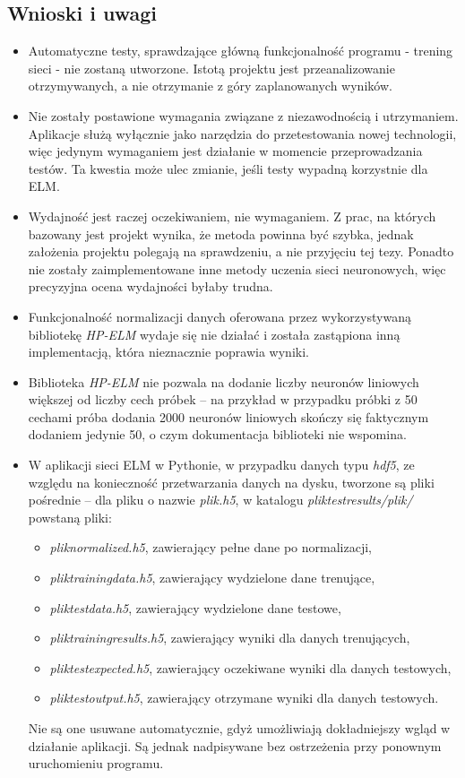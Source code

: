 \documentclass{article}
\begin{document}
\subsection{Wnioski i uwagi}
\begin{itemize}
\item Automatyczne testy, sprawdzające główną funkcjonalność programu - trening sieci - nie zostaną utworzone. Istotą projektu jest przeanalizowanie otrzymywanych, a nie otrzymanie z góry zaplanowanych wyników.
\item Nie zostały postawione wymagania związane z niezawodnością i utrzymaniem. Aplikacje służą wyłącznie jako narzędzia do przetestowania nowej technologii, więc jedynym wymaganiem jest działanie w momencie przeprowadzania testów. Ta kwestia może ulec zmianie, jeśli testy wypadną korzystnie dla ELM.
\item Wydajność jest raczej oczekiwaniem, nie wymaganiem. Z prac, na których bazowany jest projekt wynika, że metoda powinna być szybka, jednak założenia projektu polegają na sprawdzeniu, a nie przyjęciu tej tezy. Ponadto nie zostały zaimplementowane inne metody uczenia sieci neuronowych, więc precyzyjna ocena wydajności byłaby trudna.
\item Funkcjonalność normalizacji danych oferowana przez wykorzystywaną bibliotekę \textit{HP-ELM} wydaje się nie działać i została zastąpiona inną implementacją, która nieznacznie poprawia wyniki.
\item Biblioteka \textit{HP-ELM} nie pozwala na dodanie liczby neuronów liniowych większej od liczby cech próbek -- na przykład w przypadku próbki z 50 cechami próba dodania 2000 neuronów liniowych skończy się faktycznym dodaniem jedynie 50, o czym dokumentacja biblioteki nie wspomina.
\item W aplikacji sieci ELM w Pythonie, w przypadku danych typu \textit{hdf5}, ze względu na konieczność przetwarzania danych na dysku, tworzone są pliki pośrednie -- dla pliku o nazwie \textit{plik.h5}, w katalogu \textit{plik\textunderscore test\textunderscore results/plik/} powstaną pliki:
\begin{itemize}
\item \textit{plik\textunderscore normalized.h5}, zawierający pełne dane po normalizacji, 
\item \textit{plik\textunderscore training\textunderscore data.h5}, zawierający wydzielone dane trenujące, 
\item \textit{plik\textunderscore test\textunderscore data.h5}, zawierający wydzielone dane testowe,
\item \textit{plik\textunderscore training\textunderscore results.h5}, zawierający wyniki dla danych trenujących,
\item \textit{plik\textunderscore test\textunderscore expected.h5}, zawierający oczekiwane wyniki dla danych testowych,
\item \textit{plik\textunderscore test\textunderscore output.h5}, zawierający otrzymane wyniki dla danych testowych.
\end{itemize} 
Nie są one usuwane automatycznie, gdyż umożliwiają dokładniejszy wgląd w działanie aplikacji. Są jednak nadpisywane bez ostrzeżenia przy ponownym uruchomieniu programu.
\end{itemize}
\clearpage
\end{document}
